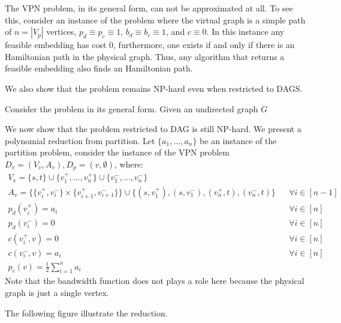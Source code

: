 The VPN problem, in its general form, can not be approximated at all.
To see this, consider an instance of the problem where the virtual graph is a simple path of $n = |V_p|$ vertices, $p_d \equiv p_c \equiv 1$, 
$b_d \equiv b_c \equiv 1$,
and $c \equiv 0$.
In this instance any feasible embedding has cost 0, furthermore, one exists if and only if there is an Hamiltonian path in the physical graph.
Thus, any algorithm that returns a feasible embedding also finds an Hamiltonian path.

We also show that the problem remains NP-hard even when restricted to DAGS.

Consider the problem in its general form. 
Given an undirected graph $G$

We now show that the problem restricted to DAG is still NP-hard.
We present a polynomial reduction from partition.
Let $\{a_1, \ldots, a_n\}$ be an instance of the partition problem, 
consider the instance of the VPN problem 
$D_v = (V_v, A_v), D_p = ({v}, \emptyset)$, 
where:
\begin{align}
V_v = \{s, t\} \cup \{v_1^+, \ldots, v_n^+\} \cup \{v_1^-, \ldots, v_n^-\}
\\
A_v = \{\{v_i^+, v_i^-\} \times \{v_{i + 1}^+, v_{i + 1}^-\}\} 
\cup \{(s, v_1^+), (s, v_1^-), (v_n^+, t), (v_n^-, t)\}
&&
\forall i \in [n-1]
\\
p_d(v_i^+) = a_i && \forall i \in [n]
\\
p_d(v_i^-) = 0 && \forall i \in [n]
\\
c(v_i^+, v) = 0 && \forall i \in [n]
\\
c(v_i^-, v) = a_i && \forall i \in [n] 
\\
p_c(v) = \frac{1}{2}\sum_{i = 1}^n a_i
\end{align}
Note that the bandwidth function does not plays a role here because the physical graph
is just a single vertex.

The following figure illustrate the reduction.
\begin{figure}[ht]
\centering

\end{figure}

